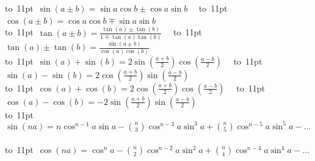 \begin{footnotesize}
\noindent
\mbox{\vbox to 11pt{  \hbox{$
\sin(a \pm b) = \sin a \cos b \pm \cos a \sin b
$}  }}
\
\mbox{\vbox to 11pt{  \hbox{$
\cos(a \pm b) = \cos a \cos b \mp \sin a \sin b
$}  }}
\\
\mbox{\vbox to 11pt{  \hbox{$
\tan(a \pm b) = \frac{\tan(a)\pm\tan(b)}{1 \mp \tan(a)\tan(b)}
$}  }}
\
\mbox{\vbox to 11pt{  \hbox{$
\tan(a) \pm \tan(b) = \frac{\sin(a \pm b)}{\cos(a)\cos(b)}
$}  }}
\\
\mbox{\vbox to 11pt{  \hbox{$
\sin(a) + \sin(b) = 2\sin(\frac{a + b}{2})\cos(\frac{a - b}{2})
$}  }}
\
\mbox{\vbox to 11pt{  \hbox{$
\sin(a) - \sin(b) = 2\cos(\frac{a + b}{2})\sin(\frac{a - b}{2})
$}  }}
\\
\mbox{\vbox to 11pt{  \hbox{$
\cos(a) + \cos(b) = 2\cos(\frac{a + b}{2})\cos(\frac{a - b}{2})
$}  }}
\
\mbox{\vbox to 11pt{  \hbox{$
\cos(a) - \cos(b) = -2\sin(\frac{a + b}{2})\sin(\frac{a - b}{2})
$}  }}
\\
\mbox{\vbox to 11pt{  \hbox{$
\sin(na) = n\cos^{n-1}a\sin a - \binom{n}{3}\cos^{n-3}a \sin^3a + \binom{n}{5}\cos^{n-5}a\sin^5a - \dots
$}  }}
\\
\mbox{\vbox to 11pt{  \hbox{$
\cos(na) = \cos^{n}a - \binom{n}{2}\cos^{n-2}a \sin^2a + \binom{n}{4}\cos^{n-4}a\sin^4a - \dots
$}  }}

\end{footnotesize}

